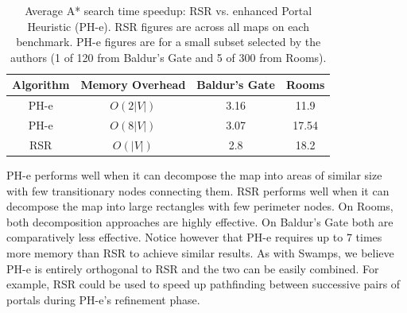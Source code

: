 \begin{table}[b]
\label{table-phspeedup}
\begin{center}
\begin{tabular}{|c|c|c|c|}
\hline
\textbf{Algorithm} & \textbf{Memory Overhead} & \textbf{Baldur's Gate} & \textbf{Rooms}  \\ \hline
PH-e & $O(2|V|)$ & 3.16 &  11.9 \\ \hline
PH-e & $O(8|V|)$ & 3.07 &  17.54 \\ \hline
RSR & $O(|V|)$ & 2.8 & 18.2 \\ \hline
\end{tabular}
\end{center}
\caption{Average A* search time speedup: RSR vs. enhanced Portal
Heuristic (PH-e). RSR figures are across all maps on each benchmark. PH-e
figures are for a small subset selected by the authors (1 of 120 from
Baldur's Gate and 5 of 300 from Rooms). }
\end{table}
PH-e performs well when it can decompose the map into areas of similar size with
few transitionary nodes connecting them.
RSR performs well when it can decompose the map into large rectangles with few
perimeter nodes.
On Rooms, both decomposition approaches are highly effective. 
On Baldur's Gate both are comparatively less effective.
Notice however that PH-e requires up to 7 times more memory than RSR to achieve
similar results.
As with Swamps, we believe PH-e is entirely orthogonal to RSR and the two can be 
easily combined. For example, RSR could be used to speed up pathfinding between
successive pairs of portals during PH-e's refinement phase.

